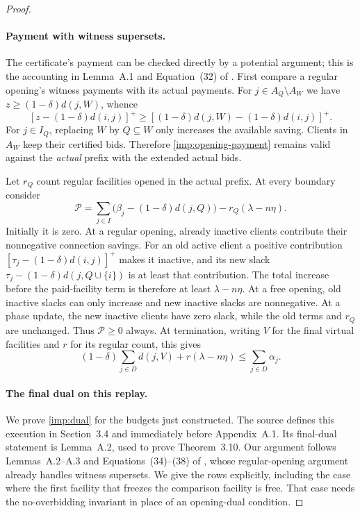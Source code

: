 \begin{proof}
\paragraph{Payment with witness supersets.}
The certificate's payment can be checked directly by a potential
argument; this is the accounting in Lemma~A.1 and Equation~(32)
of \cite{CGLSS2026}.  First compare a regular opening's witness
payments with its actual payments.  For
$j\in A_Q\setminus A_W$ we have
$z\ge(1-\delta)d(j,W)$, whence
\[
 [z-(1-\delta)d(i,j)]^+
 \ge[(1-\delta)d(j,W)-(1-\delta)d(i,j)]^+.
\]
For $j\in I_Q$, replacing $W$ by $Q\subseteq W$ only increases
the available saving.  Clients in $A_W$ keep their certified bids.
Therefore \eqref{imp:opening-payment} remains valid against the
\emph{actual} prefix with the extended actual bids.

Let $r_Q$ count regular facilities opened in the actual prefix.
At every boundary consider
\[
 \mathcal P=\sum_{j\in I}\bigl(\beta_j-(1-\delta)d(j,Q)\bigr)
              -r_Q(\lambda-n\eta).
\]
Initially it is zero.  At a regular opening, already inactive
clients contribute their nonnegative connection savings.
For an old active client a positive contribution
$[\tau_j-(1-\delta)d(i,j)]^+$ makes it inactive, and its new slack
$\tau_j-(1-\delta)d(j,Q\cup\{i\})$ is at least that
contribution.  The total increase before the paid-facility term is
therefore at least $\lambda-n\eta$.
At a free opening, old inactive slacks can only increase and new
inactive slacks are nonnegative.  At a phase update, the new inactive
clients have zero slack, while the old terms and $r_Q$ are unchanged.
Thus $\mathcal P\ge0$ always.  At termination, writing $V$ for the
final virtual facilities and $r$ for its regular count, this gives
\begin{equation}
 (1-\delta)\sum_{j\in D}d(j,V)+r(\lambda-n\eta)
           \le\sum_{j\in D}\alpha_j.
 \label{imp:virtual-payment}
\end{equation}

\paragraph{The final dual on this replay.}
We prove \eqref{imp:dual} for the budgets just constructed. The source
defines this execution in Section~3.4 and immediately
before Appendix~A.1. Its final-dual statement is Lemma~A.2, used to
prove Theorem~3.10. Our argument follows Lemmas~A.2--A.3 and
Equations~(34)--(38) of
\cite[Appendix~A.2]{CGLSS2026}, whose regular-opening argument already
handles witness supersets. We give the rows explicitly, including
the case where the first facility that freezes the comparison facility
is free.  That case needs the no-overbidding invariant in place of an
opening-dual condition.


\end{proof}
